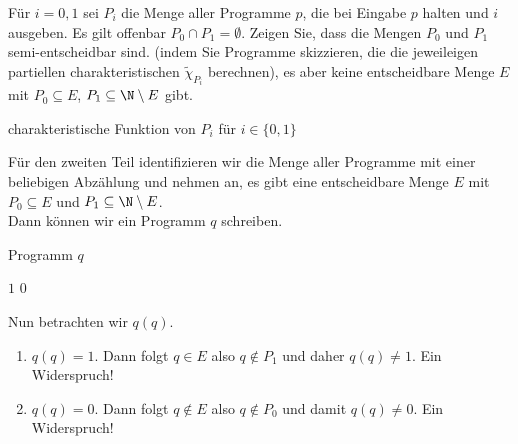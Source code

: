 
\begin{exercise}[224]
	Für $i = 0,1$ sei $P_i$ die Menge aller Programme $p$, die bei Eingabe $p$ halten und $i$ ausgeben. Es gilt offenbar $P_0 \cap P_1 = \emptyset$. Zeigen Sie, dass die Mengen $P_0$ und $P_1$ semi-entscheidbar sind. (indem Sie Programme skizzieren, die die jeweileigen partiellen charakteristischen $\tilde{\chi}_{P_i}$ berechnen), es aber keine entscheidbare Menge $E$ mit $P_0 \subseteq E$, $P_1 \subseteq \N \setminus E$ gibt.

\end{exercise}


\begin{solution}

\phantom{}

	\begin{algorithm}
		\caption{charakteristische Funktion von $P_i$ für $i \in \{0,1\}$}
		\begin{algorithmic}[1]
					\State {}
				\EndIf
			\EndProcedure
		\end{algorithmic}
	\end{algorithm}

	Für den zweiten Teil identifizieren wir die Menge aller Programme mit einer
	beliebigen Abzählung und nehmen an, es gibt eine entscheidbare Menge
	$E$ mit $P_0 \subseteq E$ und $P_1 \subseteq \N \setminus E$. \\
	Dann können wir ein Programm $q$ schreiben.

	\begin{algorithm}
		\caption{Programm $q$}
		\begin{algorithmic}[1]
			\Procedure{$q$}{$p$}
				\If{$\chi_E(p) = 1$}
					\State \Return $1$
				\Else
					\State \Return$0$
				\EndIf
			\EndProcedure
		\end{algorithmic}
	\end{algorithm}

	Nun betrachten wir $q(q)$.
	\begin{enumerate}[label = Fall \arabic*:]
		\item $q(q) = 1$. Dann folgt $q \in E$ also $q \notin P_1$ und daher $q(q) \neq 1$. Ein Widerspruch!

		\item $q(q) = 0$. Dann folgt $q \notin E$ also $q \notin P_0$ und damit $q(q) \neq 0$. Ein Widerspruch!
	\end{enumerate}
\end{solution}
